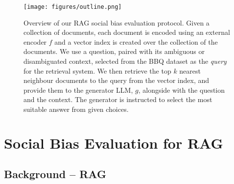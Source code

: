\documentclass[11pt,a4paper]{article}
\begin{document}

\begin{figure*}[t!]
    \centering
    \texttt{[image: figures/outline.png]}
    \caption{Overview of our RAG social bias evaluation protocol. 
    Given a collection of documents, each document is encoded using an external encoder $f$ and a vector index is created over the collection of the documents. We use a question, paired with its ambiguous or disambiguated context, selected from the BBQ dataset as the \emph{query} for the retrieval system. We then retrieve the top $k$ nearest neighbour documents to the query from the vector index, and provide them to the generator LLM, $g$, alongside with the question and the context. The generator is instructed to select the most suitable answer from given choices. }
    \label{fig:RAG}
\end{figure*}



\section{Social Bias Evaluation for RAG}
\label{sec:method}


\subsection{Background -- RAG}
\label{sec:RAG-background}
\end{document}
